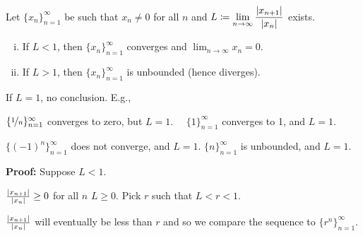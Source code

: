 \documentclass[10pt,aspectratio=169]{beamer}
\begin{document}
\begin{frame}

\begin{lemma}
Let $\{ x_n \}_{n=1}^\infty$ be such that $x_n \not= 0$ for all $n$ and
$\displaystyle L \coloneqq \lim_{n\to\infty} \frac{\left\lvert {x_{n+1}} \right\rvert}{\left\lvert {x_n} \right\rvert}$ exists.
\pause
\begin{enumerate}[(i)]
\item
If $L < 1$, then $\{ x_n \}_{n=1}^\infty$ converges and $\displaystyle \lim_{n\to\infty} x_n = 0$.
\item
\pause
If $L > 1$, then $\{ x_n \}_{n=1}^\infty$ is unbounded (hence diverges).
\end{enumerate}
\end{lemma}

\pause
If $L=1$, no conclusion. E.g.,

\pause
$\{ \nicefrac{1}{n} \}_{n=1}^\infty$ converges to zero, but $L=1$.
\pause
\quad\qquad~\,
$\{ 1 \}_{n=1}^\infty$ converges to 1, and $L=1$.

\pause
$\{ {(-1)}^n \}_{n=1}^\infty$ does not converge, and $L=1$.
\pause
\qquad
$\{  n \}_{n=1}^\infty$ is unbounded, and $L=1$.

\pause
\medskip

\textbf{Proof:}
Suppose $L < 1$.

\pause
\medskip

$\frac{\left\lvert {x_{n+1}} \right\rvert}{\left\lvert {x_n} \right\rvert} \geq 0$ for all $n$ \wthus $L \geq 0$.
\qquad
\pause
Pick $r$ such that $L < r < 1$.

\pause
\medskip

$\frac{\left\lvert {x_{n+1}} \right\rvert}{\left\lvert {x_n} \right\rvert}$ will eventually be less than $r$ and
so we compare the sequence to $\{ r^n \}_{n=1}^\infty$.

\pause
\begin{center}
\end{center}

\end{frame}
\end{document}
